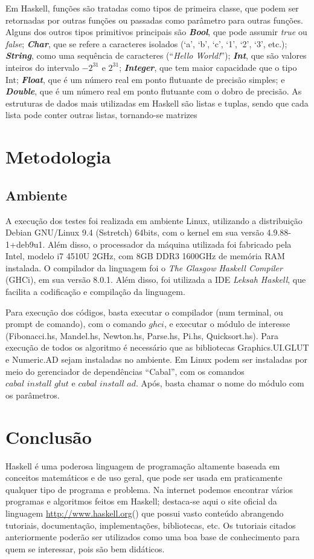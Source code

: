 \documentclass[12pt]{article}
\begin{document}
			Em Haskell, funções são tratadas como tipos de primeira classe, que podem ser retornadas por outras funções ou passadas como parâmetro para outras funções. Alguns dos outros tipos primitivos principais são \textbf{\textit{Bool}}, que pode assumir \textit{true} ou \textit{false}; \textbf{\textit{Char}}, que se refere a caracteres isolados (`a', `b', `c', `1', `2', `3', etc.); \textbf{\textit{String}}, como uma sequência de caracteres (``\textit{Hello World!}''); \textbf{\textit{Int}}, que são valores inteiros do intervalo $-2^{31}$ e $2^{31}$; \textbf{\textit{Integer}}, que tem maior capacidade que o tipo Int; \textbf{\textit{Float}}, que é um número real em ponto flutuante de precisão simples; e \textbf{\textit{Double}}, que é um número real em ponto flutuante com o dobro de precisão. As estruturas de dados mais utilizadas em Haskell são listas e tuplas, sendo que cada lista pode conter outras listas, tornando-se matrizes

	\section{Metodologia}
		\subsection{Ambiente}
			A execução dos testes foi realizada em ambiente Linux, utilizando a distribuição Debian GNU/Linux 9.4 (Sstretch) 64bits, com o kernel em sua versão 4.9.88-1+deb9u1. Além disso, o processador da máquina utilizada foi fabricado pela Intel, modelo i7 4510U 2GHz, com 8GB DDR3 1600GHz de memória RAM instalada. O compilador da linguagem foi o \textit{The Glasgow Haskell Compiler} (GHCi), em sua versão 8.0.1. Além disso, foi utilizada a IDE \textit{Leksah Haskell}, que facilita a codificação e compilação da linguagem.
			
			Para execução dos códigos, basta executar o compilador (num terminal, ou prompt de comando), com o comando $ghci$, e executar o módulo de interesse (Fibonacci.hs, Mandel.hs, Newton.hs, Parse.hs, Pi.hs, Quicksort.hs). Para execução de todos os algoritmo é necessário que as bibliotecas Graphics.UI.GLUT e Numeric.AD sejam instaladas no ambiente. Em Linux podem ser instaladas por meio do gerenciador de dependências ``Cabal'', com os comandos $\textit{cabal install glut}$ e $\textit{cabal install ad}$. Após, basta chamar o nome do módulo com os parâmetros.
			
	\section{Conclusão}
		Haskell é uma poderosa linguagem de programação altamente baseada em conceitos matemáticos e de uso geral, que pode ser usada em praticamente qualquer tipo de programa e problema. Na internet podemos encontrar vários programas e algoritmos feitos em Haskell; destaca-se aqui o site oficial da linguagem \href{http://www.haskell.org}{http://www.haskell.org}() que possui vasto conteúdo abrangendo tutoriais, documentação, implementações, bibliotecas, etc. Os tutoriais citados anteriormente poderão ser utilizados como uma boa base de conhecimento para quem se interessar, pois são bem didáticos.

	
		
\end{document}

